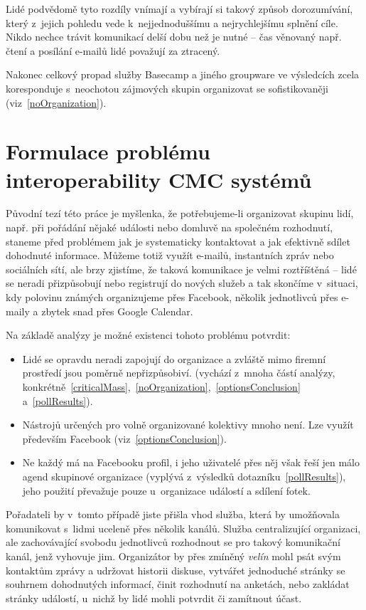 \documentclass[12pt,oneside,final]{fithesis2}
\begin{document}
Lidé podvědomě tyto rozdíly vnímají a vybírají si takový způsob dorozumívání, který z~jejich pohledu vede k~nejjednoduššímu a nejrychlejšímu splnění cíle. Nikdo nechce trávit komunikací delší dobu než je nutné -- čas věnovaný např. čtení a posílání e-mailů lidé považují za ztracený.

Nakonec celkový propad služby Basecamp a jiného groupware ve výsledcích zcela koresponduje s~neochotou zájmových skupin organizovat se so\-fis\-ti\-ko\-va\-ně\-ji (viz~\ref{noOrganization}).



\chapter{Formulace problému interoperability CMC systémů}\label{interoperabilityProblem}
Původní tezí této práce je myšlenka, že potřebujeme-li organizovat skupinu lidí, např. při pořádání nějaké události nebo domluvě na společném rozhodnutí, staneme před problémem jak je systematicky kontaktovat a jak efektivně sdílet dohodnuté informace. Můžeme totiž využít e-mailů, instantních zpráv nebo sociálních sítí, ale brzy zjistíme, že taková komunikace je velmi roztříštěná -- lidé se neradi přizpůsobují nebo registrují do nových služeb a tak skončíme v~situaci, kdy polovinu známých organizujeme přes Facebook, několik jednotlivců přes e-maily a zbytek snad přes Google Calendar.

Na základě analýzy je možné existenci tohoto problému potvrdit:

\begin{itemize}
    \item Lidé se opravdu neradi zapojují do organizace a zvláště mimo firemní prostředí jsou poměrně nepřizpůsobiví. (vychází z~mnoha částí analýzy, konkrétně~\ref{criticalMass},~\ref{noOrganization},~\ref{optionsConclusion} a~\ref{pollResults}).
    \item Nástrojů určených pro volně organizované kolektivy mnoho není. Lze využít především Facebook (viz~\ref{optionsConclusion}).
    \item Ne každý má na Facebooku profil, i jeho uživatelé přes něj však řeší jen málo agend skupinové organizace (vyplývá z~výsledků dotazníku~\ref{pollResults}), jeho použití převažuje pouze u~organizace událostí a sdílení fotek.
\end{itemize}

Pořadateli by v~tomto případě jiste přišla vhod služba, která by u\-mož\-ňo\-va\-la komunikovat s~lidmi uceleně přes několik kanálů. Služba centralizující organizaci, ale zachovávající svobodu jednotlivců rozhodnout se pro takový komunikační kanál, jenž vyhovuje jim. Organizátor by přes zmíněný \emph{velín} mohl psát svým kontaktům zprávy a udržovat historii diskuse, vytvářet jednoduché stránky se souhrnem dohodnutých informací, činit rozhodnutí na anketách, nebo zakládat stránky událostí, u~nichž by lidé mohli potvrdit či zamítnout účast.
\end{document}
